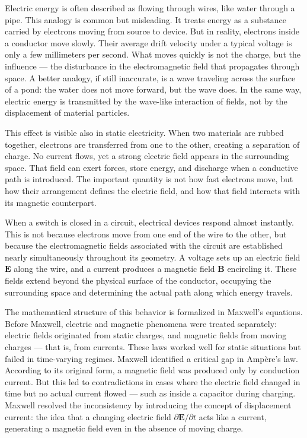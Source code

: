 Electric energy is often described as flowing through wires, like water through a pipe. This analogy is common but misleading. It treats energy as a substance carried by electrons moving from source to device. But in reality, electrons inside a conductor move slowly. Their average drift velocity under a typical voltage is only a few millimeters per second. What moves quickly is not the charge, but the influence — the disturbance in the electromagnetic field that propagates through space. A better analogy, if still inaccurate, is a wave traveling across the surface of a pond: the water does not move forward, but the wave does. In the same way, electric energy is transmitted by the wave-like interaction of fields, not by the displacement of material particles.

This effect is visible also in static electricity. When two materials are rubbed together, electrons are transferred from one to the other, creating a separation of charge. No current flows, yet a strong electric field appears in the surrounding space. That field can exert forces, store energy, and discharge when a conductive path is introduced. The important quantity is not how fast electrons move, but how their arrangement defines the electric field, and how that field interacts with its magnetic counterpart.

When a switch is closed in a circuit, electrical devices respond almost instantly. This is not because electrons move from one end of the wire to the other, but because the electromagnetic fields associated with the circuit are established nearly simultaneously throughout its geometry. A voltage sets up an electric field $\mathbf{E}$ along the wire, and a current produces a magnetic field $\mathbf{B}$ encircling it. These fields extend beyond the physical surface of the conductor, occupying the surrounding space and determining the actual path along which energy travels.

The mathematical structure of this behavior is formalized in Maxwell's equations. Before Maxwell, electric and magnetic phenomena were treated separately: electric fields originated from static charges, and magnetic fields from moving charges — that is, from currents. These laws worked well for static situations but failed in time-varying regimes. Maxwell identified a critical gap in Ampère's law. According to its original form, a magnetic field was produced only by conduction current. But this led to contradictions in cases where the electric field changed in time but no actual current flowed — such as inside a capacitor during charging. Maxwell resolved the inconsistency by introducing the concept of displacement current: the idea that a changing electric field $\partial \mathbf{E}/\partial t$ acts like a current, generating a magnetic field even in the absence of moving charge.

